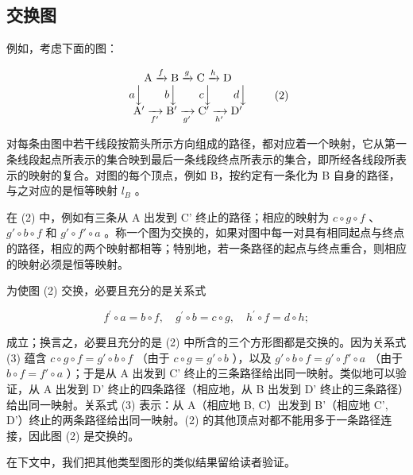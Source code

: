 \subsection{交换图}

例如，考虑下面的图：

\[
\begin{array}{c} \mathrm{A} \xrightarrow {f} \mathrm{B} \xrightarrow {g} \mathrm{C} \xrightarrow {h} \mathrm{D} \\ a \Big \downarrow \qquad b \Big \downarrow \qquad c \Big \downarrow \qquad d \Big \downarrow \\ \mathrm{A} ^ {\prime} \xrightarrow [ f ^ {\prime} ]{} \mathrm{B} ^ {\prime} \xrightarrow [ g ^ {\prime} ]{} \mathrm{C} ^ {\prime} \xrightarrow [ h ^ {\prime} ]{} \mathrm{D} ^ {\prime} \end{array}\tag{2}
\]

对每条由图中若干线段按箭头所示方向组成的路径，都对应着一个映射，它从第一条线段起点所表示的集合映到最后一条线段终点所表示的集合，即所经各线段所表示的映射的复合。对图的每个顶点，例如 B，按约定有一条化为 B 自身的路径，与之对应的是恒等映射 \(l_{B}\) 。

在 (2) 中，例如有三条从 A 出发到 C' 终止的路径；相应的映射为 \(c \circ g \circ f\) 、 \(g' \circ b \circ f\) 和 \(g' \circ f' \circ a\) 。称一个图为交换的，如果对图中每一对具有相同起点与终点的路径，相应的两个映射都相等；特别地，若一条路径的起点与终点重合，则相应的映射必须是恒等映射。

为使图 (2) 交换，必要且充分的是关系式

\[
f ^ {\prime} \circ a = b \circ f, \quad g ^ {\prime} \circ b = c \circ g, \quad h ^ {\prime} \circ f = d \circ h;\tag{3}
\]

成立；换言之，必要且充分的是 (2) 中所含的三个方形图都是交换的。因为关系式 (3) 蕴含 \(c \circ g \circ f = g' \circ b \circ f\) （由于 \(c \circ g = g' \circ b\) ），以及 \(g' \circ b \circ f = g' \circ f' \circ a\) （由于 \(b \circ f = f' \circ a\) ）；于是从 A 出发到 C' 终止的三条路径给出同一映射。类似地可以验证，从 A 出发到 D' 终止的四条路径（相应地，从 B 出发到 D' 终止的三条路径）给出同一映射。关系式 (3) 表示：从 A（相应地 B, C）出发到 B'（相应地 C', D'）终止的两条路径给出同一映射。(2) 的其他顶点对都不能用多于一条路径连接，因此图 (2) 是交换的。

在下文中，我们把其他类型图形的类似结果留给读者验证。

